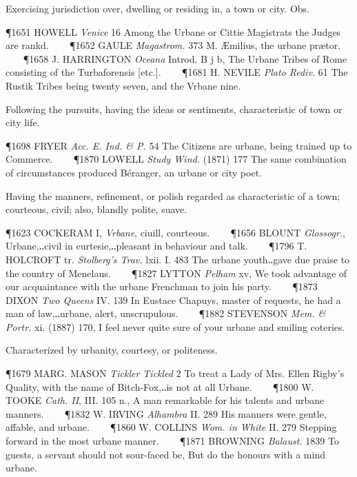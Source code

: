 \begin{description}[wide, labelwidth=!, labelindent=0pt]
\begin{myenumerate}
 Exercising jurisdiction over, dwelling or residing in, a town or city. Obs.

\P 1651 HOWELL  \textit{Venice} 16 Among the Urbane or Cittie Magistrats the Judges are rankd.    
\P 1652 GAULE  \textit{Magastrom.} 373 M. Æmilius, the urbane prætor.    
\P 1658 J. HARRINGTON  \textit{Oceana} Introd. B j b, The Urbane Tribes of Rome consisting of the Turbaforensis [etc.].    
\P 1681 H. NEVILE  \textit{Plato Rediv.} 61 The Rustik Tribes being twenty seven, and the Vrbane nine.

 Following the pursuits, having the ideas or sentiments, characteristic of town or city life.

\P 1698 FRYER  \textit{Acc. E. Ind. \& P.} 54 The Citizens are urbane, being trained up to Commerce.    
\P 1870 LOWELL  \textit{Study Wind.} (1871) 177 The same combination of circumstances produced Béranger, an urbane or city poet.

 Having the manners, refinement, or polish regarded as characteristic of a town; courteous, civil; also, blandly polite, suave.

\P 1623 COCKERAM I, \textit{Vrbane}, ciuill, courteous.    
\P 1656 BLOUNT  \textit{Glossogr.}, Urbane,‥civil in curtesie,‥pleasant in behaviour and talk.    
\P 1796 T. HOLCROFT tr. \textit{Stolberg's Trav.} lxii. I. 483 The urbane youth‥gave due praise to the country of Menelaus.    
\P 1827 LYTTON  \textit{Pelham} xv, We took advantage of our acquaintance with the urbane Frenchman to join his party.    
\P 1873 DIXON  \textit{Two Queens} IV. 139 In Eustace Chapuys, master of requests, he had a man of law,‥urbane, alert, unscrupulous.    
\P 1882 STEVENSON  \textit{Mem. \& Portr.} xi. (1887) 170, I feel never quite sure of your urbane and smiling coteries.

 Characterized by urbanity, courtesy, or politeness.

\P 1679 MARG. MASON  \textit{Tickler Tickled} 2 To treat a Lady of Mrs. Ellen Rigby's Quality, with the name of Bitch-Fox,‥is not at all Urbane.    
\P 1800 W. TOOKE  \textit{Cath. II}, III. 105 n., A man remarkable for his talents and urbane manners.    
\P 1832 W. IRVING  \textit{Alhambra} II. 289 His manners were gentle, affable, and urbane.    
\P 1860 W. COLLINS  \textit{Wom. in White} II. 279 Stepping forward in the most urbane manner.    
\P 1871 BROWNING \textit{Balaust.} 1839 To guests,  a servant should not sour-faced be, But do the honours with a mind urbane.


\end{myenumerate}
\end{description}
